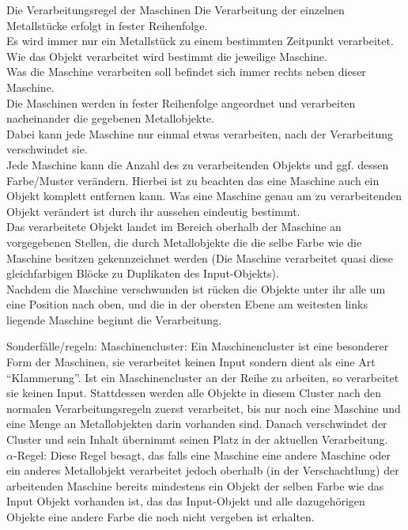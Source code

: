 \documentclass{scrartcl}
\begin{document}
\begin{description}
\begin{minipage}{1\textwidth}
	\item[Die Verarbeitungsregel der Maschinen] Die Verarbeitung der einzelnen Metallstücke erfolgt in fester Reihenfolge.\\
	Es wird immer nur ein Metallstück zu einem bestimmten Zeitpunkt verarbeitet.\\
	Wie das Objekt verarbeitet wird bestimmt die jeweilige Maschine.\\
	Was die Maschine verarbeiten soll befindet sich immer rechts neben dieser Maschine.\\
	Die Maschinen werden in fester Reihenfolge angeordnet und verarbeiten nacheinander die gegebenen Metallobjekte.\\
	Dabei kann jede Maschine nur einmal etwas verarbeiten, nach der Verarbeitung verschwindet sie.\\
	Jede Maschine kann die Anzahl des zu verarbeitenden Objekts und ggf. dessen Farbe/Muster verändern. Hierbei ist zu beachten das eine Maschine auch ein Objekt komplett entfernen kann. Was eine Maschine genau am zu verarbeitenden Objekt verändert ist durch ihr aussehen eindeutig bestimmt.\\
	Das verarbeitete Objekt landet im Bereich oberhalb der Maschine an vorgegebenen Stellen, die durch Metallobjekte die die selbe Farbe wie die Maschine besitzen gekennzeichnet werden (Die Maschine verarbeitet quasi diese gleichfarbigen Blöcke zu Duplikaten des Input-Objekts).\\
	Nachdem die Maschine verschwunden ist rücken die Objekte unter ihr alle um eine Position nach oben, und die in der obersten Ebene am weitesten links liegende Maschine beginnt die Verarbeitung.\\
\end{minipage}	
	
\begin{minipage}{1\textwidth}
	\item[Sonderfälle/regeln:] Maschinencluster: Ein Maschinencluster ist eine besonderer Form der Maschinen, sie verarbeitet keinen Input sondern dient als eine Art \enquote{Klammerung}. Ist ein Maschinencluster an der Reihe zu arbeiten, so verarbeitet sie keinen Input. Stattdessen werden alle Objekte in diesem Cluster nach den normalen Verarbeitungsregeln zuerst verarbeitet, bis nur noch eine Maschine und eine Menge an Metallobjekten darin vorhanden sind. Danach verschwindet der Cluster und sein Inhalt übernimmt seinen Platz in der aktuellen Verarbeitung.\\
	$\alpha$-Regel: Diese Regel besagt, das falls eine Maschine eine andere Maschine oder ein anderes Metallobjekt verarbeitet jedoch oberhalb (in der Verschachtlung) der arbeitenden Maschine bereits mindestens ein Objekt der selben Farbe wie das Input Objekt vorhanden ist, das das Input-Objekt und alle dazugehörigen Objekte eine andere Farbe die noch nicht vergeben ist erhalten.\\
\end{minipage}

\end{description}
\end{document}
